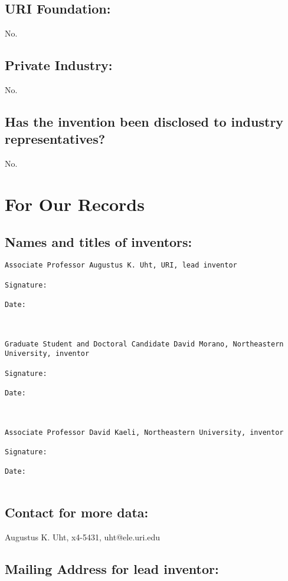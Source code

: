 \documentclass[10pt,dvips]{article}
\begin{document}
\subsection{URI Foundation:} No.

\subsection{Private Industry:} No.

\subsection{Has the invention been disclosed to industry representatives?} No.

\newpage

\section{For Our Records}

\subsection{Names and titles of inventors:}

\begin{verbatim}
Associate Professor Augustus K. Uht, URI, lead inventor

Signature:

Date:



Graduate Student and Doctoral Candidate David Morano, Northeastern University, inventor

Signature:

Date:



Associate Professor David Kaeli, Northeastern University, inventor

Signature:

Date:


\end{verbatim}

\subsection{Contact for more data:} Augustus K. Uht, x4-5431, uht@ele.uri.edu

\subsection{Mailing Address for lead inventor:}
\end{document}
